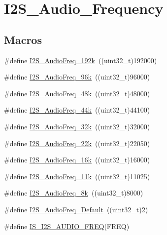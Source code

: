 \hypertarget{group___i2_s___audio___frequency}{}\section{I2\+S\+\_\+\+Audio\+\_\+\+Frequency}
\label{group___i2_s___audio___frequency}
\subsection*{Macros}
\begin{DoxyCompactItemize}
\item 
\#define \mbox{\hyperlink{group___i2_s___audio___frequency_gadfdaed9a2acb71f2cdd737be81a6f747}{I2\+S\+\_\+\+Audio\+Freq\+\_\+192k}}~((uint32\+\_\+t)192000)
\item 
\#define \mbox{\hyperlink{group___i2_s___audio___frequency_ga5acd02a974e90bb8f2c4e07f8fa0231b}{I2\+S\+\_\+\+Audio\+Freq\+\_\+96k}}~((uint32\+\_\+t)96000)
\item 
\#define \mbox{\hyperlink{group___i2_s___audio___frequency_gac5f3f0416f9dd03d680d0fcee93b50ab}{I2\+S\+\_\+\+Audio\+Freq\+\_\+48k}}~((uint32\+\_\+t)48000)
\item 
\#define \mbox{\hyperlink{group___i2_s___audio___frequency_ga3514e4c292b92b8a7d8a6916f4e3690c}{I2\+S\+\_\+\+Audio\+Freq\+\_\+44k}}~((uint32\+\_\+t)44100)
\item 
\#define \mbox{\hyperlink{group___i2_s___audio___frequency_gac501b566718f4890aaafa323a33b732c}{I2\+S\+\_\+\+Audio\+Freq\+\_\+32k}}~((uint32\+\_\+t)32000)
\item 
\#define \mbox{\hyperlink{group___i2_s___audio___frequency_gac6adafe5586e83c2408f1eab8edb4ab3}{I2\+S\+\_\+\+Audio\+Freq\+\_\+22k}}~((uint32\+\_\+t)22050)
\item 
\#define \mbox{\hyperlink{group___i2_s___audio___frequency_ga5b8f2f8393e022becf0dbb04d1b01950}{I2\+S\+\_\+\+Audio\+Freq\+\_\+16k}}~((uint32\+\_\+t)16000)
\item 
\#define \mbox{\hyperlink{group___i2_s___audio___frequency_ga3adf95fadd1ad75670ed1babd5faca39}{I2\+S\+\_\+\+Audio\+Freq\+\_\+11k}}~((uint32\+\_\+t)11025)
\item 
\#define \mbox{\hyperlink{group___i2_s___audio___frequency_ga7868ac234485a80d45586dd87cd00043}{I2\+S\+\_\+\+Audio\+Freq\+\_\+8k}}~((uint32\+\_\+t)8000)
\item 
\#define \mbox{\hyperlink{group___i2_s___audio___frequency_ga30f78e8214e8a91cdb6d6360c1d3f18d}{I2\+S\+\_\+\+Audio\+Freq\+\_\+\+Default}}~((uint32\+\_\+t)2)
\item 
\#define \mbox{\hyperlink{group___i2_s___audio___frequency_gaf39d917f4a38fd9916ec347fb055391c}{I\+S\+\_\+\+I2\+S\+\_\+\+A\+U\+D\+I\+O\+\_\+\+F\+R\+EQ}}(F\+R\+EQ)
\end{DoxyCompactItemize}


